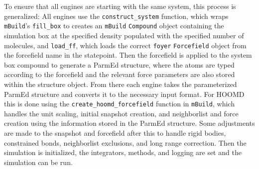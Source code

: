 To ensure that all engines are starting with the same system, this process is generalized: All engines use the \lstinline{construct_system} function, which wraps \texttt{mBuild}'s \lstinline{fill_box} to creates an \texttt{mBuild} \lstinline{Compound} object containing the simulation box at the specified density populated with the specified number of molecules, and \lstinline{load_ff}, which loads the correct \texttt{foyer} \lstinline{Forcefield} object from the forcefield name in the statepoint. 
Then the forcefield is applied to the system box compound to generate a ParmEd structure\cite{Shirts2017}, where the atoms are typed according to the forcefield and the relevant force parameters are also stored within the structure object. 
From there each engine takes the parameterized ParmEd structure and converts it to the necessary input format. 
For HOOMD this is done using the \lstinline{create_hoomd_forcefield} function in \texttt{mBuild}, which handles the unit scaling, initial snapshot creation, and neighborlist and force creation using the information stored in the ParmEd structure. 
Some adjustments are made to the snapshot and forcefield after this to handle rigid bodies, constrained bonds, neighborlist exclusions, and long range correction. 
Then the simulation is initialized, the integrators, methods, and logging are set and the simulation can be run. 

